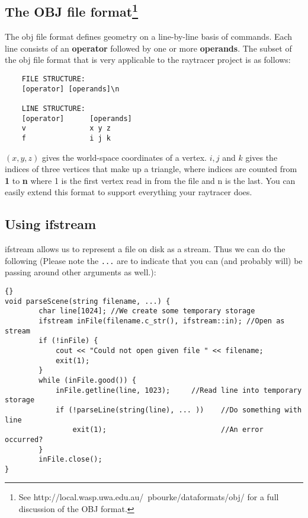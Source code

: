 \documentclass[]{article}
\begin{document}
\subsection{The OBJ file format\footnote{See http://local.wasp.uwa.edu.au/~pbourke/dataformats/obj/ for a full discussion of the OBJ format.}}

The obj file format defines geometry on a line-by-line basis of commands. Each line consists of an \textbf{operator} followed by one or more \textbf{operands}. The subset of the obj file format that is very applicable to the raytracer project is as follows:

\begin{verbatim}
    FILE STRUCTURE:
    [operator] [operands]\n
     
    LINE STRUCTURE:
    [operator]      [operands]
    v               x y z
    f               i j k
\end{verbatim}

$(x,y,z)$ gives the world-space coordinates of a vertex. $i, j$ and $k$ gives the indices of three vertices that make up a triangle, where indices are counted from \textbf{1} to \textbf{n} where 1 is the first vertex read in from the file and n is the last. You can easily extend this format to support everything your raytracer does.

\subsection{Using ifstream}

ifstream allows us to represent a file on disk as a stream. Thus we can do the following (Please note the \verb=...= are to indicate that you can (and probably will) be passing around other arguments as well.):

\lstset{language=c++}
\lstset{commentstyle=\textit}
\begin{lstlisting}[frame=TRBL, caption=Using ifstream]{}
void parseScene(string filename, ...) {
        char line[1024]; //We create some temporary storage
        ifstream inFile(filename.c_str(), ifstream::in); //Open as stream
        if (!inFile) {
            cout << "Could not open given file " << filename;
            exit(1);
        }
        while (inFile.good()) {
            inFile.getline(line, 1023);     //Read line into temporary storage
            if (!parseLine(string(line), ... ))    //Do something with line
                exit(1);                           //An error occurred?
        }
        inFile.close();
}
\end{lstlisting}
\end{document}
